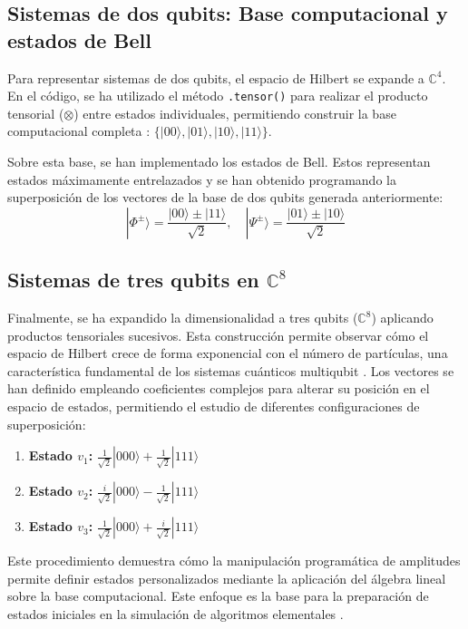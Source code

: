 \documentclass[11pt,a4paper,spanish]{book}
\begin{document}
\subsection{Sistemas de dos qubits: Base computacional y estados de Bell}
Para representar sistemas de dos qubits, el espacio de Hilbert se expande a $\mathbb{C}^4$. En el código, se ha utilizado el método \texttt{.tensor()} para realizar el producto tensorial ($\otimes$) entre estados individuales, permitiendo construir la base computacional completa \citep{dirac1939}: $\{|00\rangle, |01\rangle, |10\rangle, |11\rangle\}$.

Sobre esta base, se han implementado los estados de Bell. Estos representan estados máximamente entrelazados \citep{bell1964} y se han obtenido programando la superposición de los vectores de la base de dos qubits generada anteriormente:
\begin{equation}
|\Phi^{\pm}\rangle = \frac{|00\rangle \pm |11\rangle}{\sqrt{2}}, \quad |\Psi^{\pm}\rangle = \frac{|01\rangle \pm |10\rangle}{\sqrt{2}}
\end{equation}

\subsection{Sistemas de tres qubits en $\mathbb{C}^8$}
Finalmente, se ha expandido la dimensionalidad a tres qubits ($\mathbb{C}^8$) aplicando productos tensoriales sucesivos. Esta construcción permite observar cómo el espacio de Hilbert crece de forma exponencial con el número de partículas, una característica fundamental de los sistemas cuánticos multiqubit \citep{nielsen2010}. Los vectores se han definido empleando coeficientes complejos para alterar su posición en el espacio de estados, permitiendo el estudio de diferentes configuraciones de superposición:

\begin{enumerate}
    \item \textbf{Estado $v_1$:} $\frac{1}{\sqrt{2}}|000\rangle + \frac{1}{\sqrt{2}}|111\rangle$
    \item \textbf{Estado $v_2$:} $\frac{i}{\sqrt{2}}|000\rangle - \frac{1}{\sqrt{2}}|111\rangle$
    \item \textbf{Estado $v_3$:} $\frac{1}{\sqrt{2}}|000\rangle + \frac{i}{\sqrt{2}}|111\rangle$
\end{enumerate}

Este procedimiento demuestra cómo la manipulación programática de amplitudes permite definir estados personalizados mediante la aplicación del álgebra lineal sobre la base computacional. Este enfoque es la base para la preparación de estados iniciales en la simulación de algoritmos elementales \citep{dirac1939, qiskit2023}.
\end{document}
